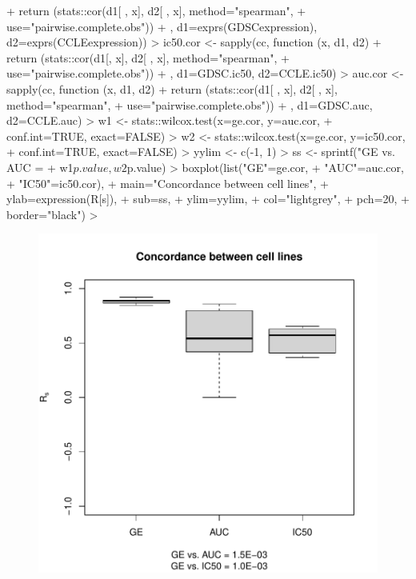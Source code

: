 \documentclass[11pt]{article}
\begin{document}
\begin{Schunk}
\begin{Sinput}
{+     return (stats::cor(d1[ , x], d2[ , x], method="spearman",
+                 use="pairwise.complete.obs"))
+   }, d1=exprs(GDSCexpression), d2=exprs(CCLEexpression))
>   ic50.cor <- sapply(cc, function (x, d1, d2) {
+     return (stats::cor(d1[, x], d2[ , x], method="spearman",
+                 use="pairwise.complete.obs"))
+   }, d1=GDSC.ic50, d2=CCLE.ic50)
>   auc.cor <- sapply(cc, function (x, d1, d2) {
+     return (stats::cor(d1[ , x], d2[ , x], method="spearman",
+                 use="pairwise.complete.obs"))
+   }, d1=GDSC.auc, d2=CCLE.auc)
>   w1 <- stats::wilcox.test(x=ge.cor, y=auc.cor,
+                            conf.int=TRUE, exact=FALSE)
>   w2 <- stats::wilcox.test(x=ge.cor, y=ic50.cor,
+                            conf.int=TRUE, exact=FALSE)
>   yylim <- c(-1, 1)
>   ss <- sprintf("GE vs. AUC = %
+                 w1$p.value, w2$p.value)
>   boxplot(list("GE"=ge.cor,
+                "AUC"=auc.cor,
+                "IC50"=ic50.cor),
+           main="Concordance between cell lines",
+           ylab=expression(R[s]),
+           sub=ss,
+           ylim=yylim,
+           col="lightgrey",
+           pch=20,
+           border="black")
> 
\end{Sinput}
\end{Schunk}

\begin{figure}[hbtp]
\begin{center}
\includegraphics{PharmacoGx-fig2}
\end{center}
\label{fig:one}
\end{figure}
\end{document}
